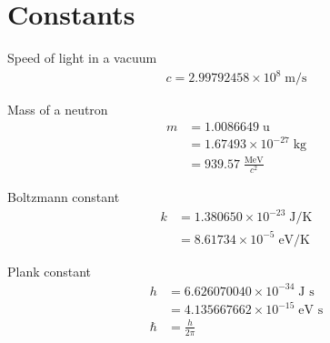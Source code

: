 \documentclass[11pt]{article}
\begin{document}
\section{Constants}
\label{sec:orgheadline45}
Speed of light in a vacuum
\begin{align*}
  c = 2.99792458 \times 10^8 \; \text{m/s}
\end{align*}

Mass of a neutron
\begin{align*}
  m &= 1.0086649 \; \text{u} \\
    &= 1.67493 \times 10^{-27} \; \text{kg} \\
    &= 939.57 \; \frac{\text{MeV}}{c^2}
\end{align*}

Boltzmann constant
\begin{align*}
  k &= 1.380650 \times 10^{-23} \; \text{J/K} \\
    &= 8.61734 \times 10^{-5} \; \text{eV/K}
\end{align*}

Plank constant
\begin{align*}
  h &= 6.626070040 \times 10^{-34} \; \text{J s} \\
    &= 4.135667662 \times 10^{-15} \; \text{eV s} \\
  \hbar &= \frac{h}{2\pi}
\end{align*}
\end{document}
